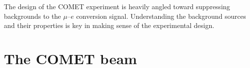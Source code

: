 The design of the COMET experiment is heavily angled toward suppressing
backgrounds to the $\mu$--$e$ conversion signal. Understanding the background
sources and their properties is key in making sense of the experimental design.

\section{The COMET beam}\label{sec:COMET_beam}





